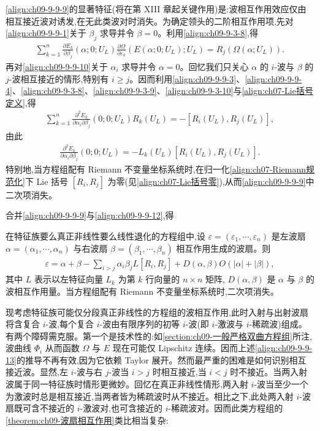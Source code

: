 \documentclass[../../main.tex]{subfiles}
\begin{document}
\eqref{align:ch09-9-9-9}的显著特征(将在第 XIII 章起关键作用)是:波相互作用效应仅由相互接近波对诱发,在无此类波对时消失。为确定领头的二阶相互作用项,先对\eqref{align:ch09-9-9-1}关于 $\beta_{j}$ 求导并令 $\beta=0$。利用\eqref{align:ch09-9-3-8},得
\begin{align}
\sum_{k=1}^{n}\frac{\partial E_{k}}{\partial\beta_{j}}(\alpha;0;U_{L})\frac{\partial\Omega}{\partial\varepsilon_{k}}(E(\alpha;0;U_{L});U_{L})=R_{j}(\Omega(\alpha;U_{L})).
\label{align:ch09-9-9-10}
\end{align}
再对\eqref{align:ch09-9-9-10}关于 $\alpha_{i}$ 求导并令 $\alpha=0$。回忆我们只关心 $\alpha$ 的 $i$-波与 $\beta$ 的 $j$-波相互接近的情形,特别有 $i\geqslant j$。因而利用\eqref{align:ch09-9-9-3}、\eqref{align:ch09-9-9-4}、\eqref{align:ch09-9-3-8}、\eqref{align:ch09-9-3-9}、\eqref{align:ch09-9-3-10}与\eqref{align:ch07-Lie括号定义},得
\begin{align}
\sum_{k=1}^{n}\frac{\partial^{2}E_{k}}{\partial\alpha_{i}\partial\beta_{j}}(0;0;U_{L})R_{k}(U_{L})=-[R_{i}(U_{L}),R_{j}(U_{L})],
\label{align:ch09-9-9-11}
\end{align}
由此
\begin{align}
\frac{\partial^{2}E_{k}}{\partial\alpha_{i}\partial\beta_{j}}(0;0;U_{L})=-L_{k}(U_{L})[R_{i}(U_{L}),R_{j}(U_{L})].
\label{align:ch09-9-9-12}
\end{align}
特别地,当方程组配有 Riemann 不变量坐标系统时,在归一化\eqref{align:ch07-Riemann规范化}下 Lie 括号 $[R_{i},R_{j}]$ 为零(见\eqref{align:ch07-Lie括号零}),从而\eqref{align:ch09-9-9-9}中二次项消失。

合并\eqref{align:ch09-9-9-9}与\eqref{align:ch09-9-9-12},得

\begin{theorem}\label{theorem:ch09-波扇相互作用}
在特征族要么真正非线性要么线性退化的方程组中,设 $\varepsilon=(\varepsilon_{1},\cdots ,\varepsilon_{n})$ 是左波扇 $\alpha=(\alpha_{1},\cdots ,\alpha_{n})$ 与右波扇 $\beta=(\beta_{1},\cdots ,\beta_{n})$ 相互作用生成的波扇。则
\begin{align}
\varepsilon=\alpha+\beta-\sum_{i>j}\alpha_{i}\beta_{j}L[R_{i},R_{j}]+D(\alpha,\beta)O(|\alpha|+|\beta|),
\label{align:ch09-9-9-13}
\end{align}
其中 $L$ 表示以左特征向量 $L_{k}$ 为第 $k$ 行向量的 $n\times n$ 矩阵, $D(\alpha,\beta)$ 是 $\alpha$ 与 $\beta$ 的波相互作用量。当方程组配有 Riemann 不变量坐标系统时,二次项消失。
\end{theorem}

现考虑特征族可能仅分段真正非线性的方程组的波相互作用,此时入射与出射波扇将含复合 $i$-波,每个复合 $i$-波由有限序列的初等 $i$-波(即 $i$-激波与 $i$-稀疏波)组成。有两个障碍需克服。第一个是技术性的:如\cref{section:ch09-一般严格双曲方程组}所注,波曲线 $\Phi_{i}$ 从而函数 $\Omega$ 与 $E$ 现在可能仅 Lipschitz 连续。因而上述\eqref{align:ch09-9-9-13}的推导不再有效,因为它依赖 Taylor 展开。然而最严重的困难是如何识别相互接近波。显然,左 $i$-波与右 $j$-波当 $i>j$ 时相互接近,当 $i<j$ 时不接近。当两入射波属于同一特征族时情形更微妙。回忆在真正非线性情形,两入射 $i$-波当至少一个为激波时总是相互接近,当两者皆为稀疏波时从不接近。相比之下,此处两入射 $i$-波扇既可含不接近的 $i$-激波对,也可含接近的 $i$-稀疏波对。因而此类方程组的\cref{theorem:ch09-波扇相互作用}类比相当复杂:
\end{document}
